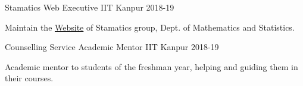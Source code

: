 
\begin{cventries}
  \cventry
  {Stamatics}
  {Web Executive}
  {IIT Kanpur}
  {2018-19}
  {
    \begin{cvitems}
    \item Maintain the {\href{http://www.iitk.ac.in/math/STAMATICS/}{Website}} of Stamatics group, Dept. of Mathematics and Statistics.
    \end{cvitems}
  }
  
  \cventry
  {Counselling Service}
  {Academic Mentor}
  {IIT Kanpur}
  {2018-19}
  {
    \begin{cvitems}
    \item Academic mentor to students of the freshman year, helping and guiding them in their courses.
    \end{cvitems}
  }

\end{cventries}

